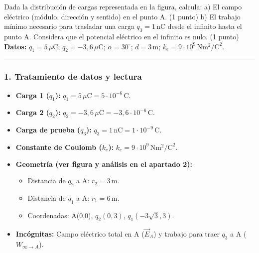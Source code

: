 \begin{cajaenunciado}
Dada la distribución de cargas representada en la figura, calcula:
a) El campo eléctrico (módulo, dirección y sentido) en el punto A. (1 punto)
b) El trabajo mínimo necesario para trasladar una carga $q_{3}=1\,\text{nC}$ desde el infinito hasta el punto A. Considera que el potencial eléctrico en el infinito es nulo. (1 punto)
\textbf{Datos:} $q_{1}=5\,\mu\text{C}$; $q_{2}=-3,6\,\mu\text{C}$; $\alpha=30^{\circ}$; $d=3\,\text{m}$; $k_{e}=9\cdot10^{9}\,\text{N}\text{m}^2/\text{C}^2$.
\end{cajaenunciado}
\hrule

\subsubsection*{1. Tratamiento de datos y lectura}
\begin{itemize}
    \item \textbf{Carga 1 ($q_1$):} $q_1 = 5\,\mu\text{C} = 5 \cdot 10^{-6}\,\text{C}$.
    \item \textbf{Carga 2 ($q_2$):} $q_2 = -3,6\,\mu\text{C} = -3,6 \cdot 10^{-6}\,\text{C}$.
    \item \textbf{Carga de prueba ($q_3$):} $q_3 = 1\,\text{nC} = 1 \cdot 10^{-9}\,\text{C}$.
    \item \textbf{Constante de Coulomb ($k_e$):} $k_e = 9 \cdot 10^9\,\text{N}\text{m}^2/\text{C}^2$.
    \item \textbf{Geometría (ver figura y análisis en el apartado 2):}
        \begin{itemize}
            \item Distancia de $q_2$ a A: $r_2 = 3\,\text{m}$.
            \item Distancia de $q_1$ a A: $r_1 = 6\,\text{m}$.
            \item Coordenadas: A(0,0), $q_2(0,3)$, $q_1(-3\sqrt{3}, 3)$.
        \end{itemize}
    \item \textbf{Incógnitas:} Campo eléctrico total en A ($\vec{E}_A$) y trabajo para traer $q_3$ a A ($W_{\infty \to A}$).
\end{itemize}

